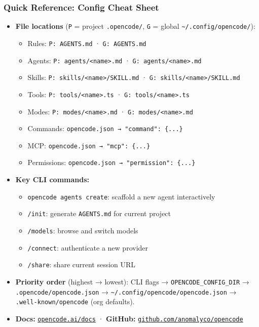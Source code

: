 \begin{frame}[fragile]\frametitle{Quick Reference:  Config Cheat Sheet}
  \begin{itemize}
    \item \textbf{File locations} (\texttt{P} = project \texttt{.opencode/}, \texttt{G} = global \texttt{\textasciitilde/.config/opencode/}):
      \begin{itemize}
        \item Rules: \texttt{P: AGENTS.md} · \texttt{G: AGENTS.md}
        \item Agents: \texttt{P: agents/<name>.md} · \texttt{G: agents/<name>.md}
        \item Skills: \texttt{P: skills/<name>/SKILL.md} · \texttt{G: skills/<name>/SKILL.md}
        \item Tools: \texttt{P: tools/<name>.ts} · \texttt{G: tools/<name>.ts}
        \item Modes: \texttt{P: modes/<name>.md} · \texttt{G: modes/<name>.md}
        \item Commands: \texttt{opencode.json → "command": \{...\}}
        \item MCP: \texttt{opencode.json → "mcp": \{...\}}
        \item Permissions: \texttt{opencode.json → "permission": \{...\}}
      \end{itemize}
    \item \textbf{Key CLI commands:}
      \begin{itemize}
        \item \texttt{opencode agents create}:  scaffold a new agent interactively
        \item \texttt{/init}:  generate \texttt{AGENTS.md} for current project
        \item \texttt{/models}:  browse and switch models
        \item \texttt{/connect}:  authenticate a new provider
        \item \texttt{/share}:  share current session URL
      \end{itemize}
    \item \textbf{Priority order} (highest → lowest): CLI flags → \texttt{OPENCODE\_CONFIG\_DIR} → \texttt{.opencode/opencode.json} → \texttt{\textasciitilde/.config/opencode/opencode.json} → \texttt{.well-known/opencode} (org defaults).
    \item \textbf{Docs:} \href{https://opencode.ai/docs}{\texttt{opencode.ai/docs}} · \textbf{GitHub:} \href{https://github.com/anomalyco/opencode}{\texttt{github.com/anomalyco/opencode}}
  \end{itemize}
\end{frame}

